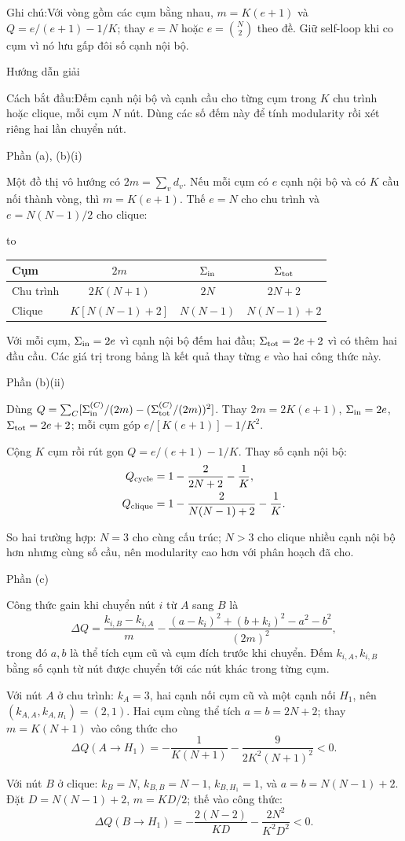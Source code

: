 \documentclass[10pt,a4paper,twocolumn]{article}
\makeatletter
\newcommand{\maptag}[1]{\phantomsection\@bsphack\protected@write\@auxout{}{\string\newlabel{#1}{{}{\thepage}{}{\@currentHref}{}}}\@esphack}
\newcommand{\key}[1]{#1:\enspace}
\newcommand{\solutionprompt}[1]{\par\addvspace{1pt}\noindent\key{Cách bắt đầu}#1\par\addvspace{2pt}}
\newcommand{\examnote}[1]{\par\addvspace{2pt}\noindent\key{Ghi chú}#1\par\addvspace{3pt}}
\newcommand{\blocklabel}[1]{\par\noindent#1\par\nobreak}
\newcommand{\answer}[1]{%
  \par\addvspace{3pt}%
  \blocklabel{#1Hướng dẫn giải}}
\newcommand{\guidepart}[1]{%
  \par\addvspace{1.5pt}%
  \blocklabel{Phần #1}}
\newenvironment{examtable}[1]{%
  \par\addvspace{2pt}\noindent\hbox to \linewidth\bgroup\hfil
  \setlength{\tabcolsep}{4pt}%
  \renewcommand{\arraystretch}{1.12}\begin{tabular}{#1}%
}{\end{tabular}\hfil\egroup\par\addvspace{2pt}}
\makeatother
\begin{document}
\examnote{Với vòng gồm các cụm bằng nhau, $m=K(e+1)$ và $Q=e/(e+1)-1/K$; thay $e=N$ hoặc $e=\binom N2$ theo đề. Giữ self-loop khi co cụm vì nó lưu gấp đôi số cạnh nội bộ.}
\answer{\maptag{answer:P25-Q4}}
\solutionprompt{Đếm cạnh nội bộ và cạnh cầu cho từng cụm trong $K$ chu trình hoặc clique, mỗi cụm $N$ nút. Dùng các số đếm này để tính modularity rồi xét riêng hai lần chuyển nút.}
\guidepart{(a), (b)(i)}
\begin{guidesteps}
\item Một đồ thị vô hướng có $2m=\sum_vd_v$. Nếu mỗi cụm có $e$ cạnh nội bộ và có $K$ cầu nối thành vòng, thì $m=K(e+1)$. Thế $e=N$ cho chu trình và $e=N(N-1)/2$ cho clique:
\begin{examtable}{@{}l c c c@{}}
\toprule
Cụm & $2m$ & $\Sigma_{\rm in}$ & $\Sigma_{\rm tot}$ \\
\midrule
Chu trình & $2K(N+1)$ & $2N$ & $2N+2$ \\
Clique & $K[N(N-1)+2]$ & $N(N-1)$ & $N(N-1)+2$ \\
\bottomrule
\end{examtable}
\item Với mỗi cụm, $\Sigma_{\rm in}=2e$ vì cạnh nội bộ đếm hai đầu; $\Sigma_{\rm tot}=2e+2$ vì có thêm hai đầu cầu. Các giá trị trong bảng là kết quả thay từng $e$ vào hai công thức này.
\end{guidesteps}
\guidepart{(b)(ii)}
\begin{guidesteps}
\item Dùng $Q=\sum_C[\Sigma_{\rm in}^{(C)}/(2m)-(\Sigma_{\rm tot}^{(C)}/(2m))^2]$. Thay $2m=2K(e+1)$, $\Sigma_{\rm in}=2e$, $\Sigma_{\rm tot}=2e+2$; mỗi cụm góp $e/[K(e+1)]-1/K^2$.
\item Cộng $K$ cụm rồi rút gọn $Q=e/(e+1)-1/K$. Thay số cạnh nội bộ:
\[
\begin{aligned}
Q_{\rm cycle}&=1-\frac{2}{2N+2}-\frac1K,\\
Q_{\rm clique}&=1-\frac{2}{N(N-1)+2}-\frac1K.
\end{aligned}
\]
\item So hai trường hợp: $N=3$ cho cùng cấu trúc; $N>3$ cho clique nhiều cạnh nội bộ hơn nhưng cùng số cầu, nên modularity cao hơn với phân hoạch đã cho.
\end{guidesteps}
\guidepart{(c)}
\begin{guidesteps}
\item Công thức gain khi chuyển nút $i$ từ $A$ sang $B$ là
\[
\Delta Q=\frac{k_{i,B}-k_{i,A}}{m}
-\frac{(a-k_i)^2+(b+k_i)^2-a^2-b^2}{(2m)^2},
\]
trong đó $a,b$ là thể tích cụm cũ và cụm đích trước khi chuyển. Đếm $k_{i,A},k_{i,B}$ bằng số cạnh từ nút được chuyển tới các nút khác trong từng cụm.
\item Với nút $A$ ở chu trình: $k_A=3$, hai cạnh nối cụm cũ và một cạnh nối $H_1$, nên $(k_{A,A},k_{A,H_1})=(2,1)$. Hai cụm cùng thể tích $a=b=2N+2$; thay $m=K(N+1)$ vào công thức cho
\[
\Delta Q(A\to H_1)=-\frac1{K(N+1)}-\frac9{2K^2(N+1)^2}<0.
\]
\item Với nút $B$ ở clique: $k_B=N$, $k_{B,B}=N-1$, $k_{B,H_1}=1$, và $a=b=N(N-1)+2$. Đặt $D=N(N-1)+2$, $m=KD/2$; thế vào công thức:
\[
\Delta Q(B\to H_1)=-\frac{2(N-2)}{KD}-\frac{2N^2}{K^2D^2}<0.
\]
\end{guidesteps}
\end{document}
